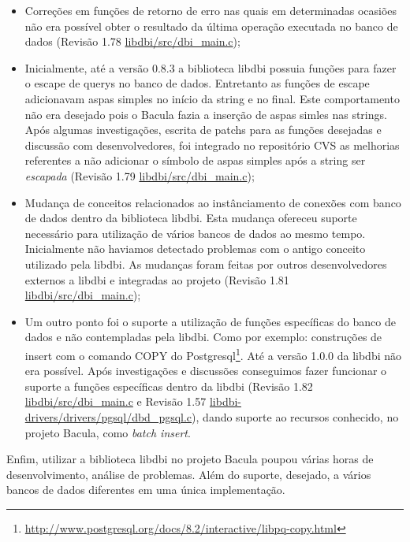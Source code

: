 \begin{itemize}
 \item Correções em funções de retorno de erro nas quais em determinadas ocasiões não era possível obter o resultado da última operação executada no banco de dados (Revisão 1.78 \url{libdbi/src/dbi_main.c});
 \item Inicialmente, até a versão 0.8.3 a biblioteca libdbi possuia funções para fazer o escape de querys no banco de dados. Entretanto as funções de escape adicionavam aspas simples no início da string e no final. Este comportamento não era desejado pois o Bacula fazia a inserção de aspas simles nas strings. Após algumas investigações, escrita de patchs para as funções desejadas e discussão com desenvolvedores, foi integrado no repositório CVS as melhorias referentes a não adicionar o símbolo de aspas simples após a string ser \textit{escapada} (Revisão 1.79 \url{libdbi/src/dbi_main.c});
 \item Mudança de conceitos relacionados ao instânciamento de conexões com banco de dados dentro da biblioteca libdbi. Esta mudança ofereceu suporte necessário para utilização de vários bancos de dados ao mesmo tempo. Inicialmente não haviamos detectado problemas com o antigo conceito utilizado pela libdbi. As mudanças foram feitas por outros desenvolvedores externos a libdbi e integradas ao projeto (Revisão 1.81 \url{libdbi/src/dbi_main.c});
 \item Um outro ponto foi o suporte a utilização de funções específicas do banco de dados e não contempladas pela libdbi. Como por exemplo: construções de insert com o comando COPY do Postgresql\footnote{\url{http://www.postgresql.org/docs/8.2/interactive/libpq-copy.html}}. Até a versão 1.0.0 da libdbi não era possível. Após investigações e discussões conseguimos fazer funcionar o suporte a funções específicas dentro da libdbi (Revisão 1.82 \url{libdbi/src/dbi_main.c} e Revisão 1.57 \url{libdbi-drivers/drivers/pgsql/dbd_pgsql.c}), dando suporte ao recursos conhecido, no projeto Bacula, como \textit{batch insert}.
\end{itemize}

Enfim, utilizar a biblioteca libdbi no projeto Bacula poupou várias horas de desenvolvimento, análise de problemas. Além do suporte, desejado, a vários bancos de dados diferentes em uma única implementação.